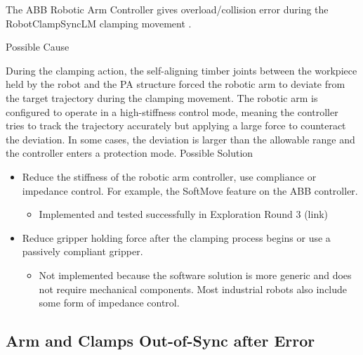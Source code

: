The ABB Robotic Arm Controller gives overload/collision error during the RobotClampSyncLM clamping movement .

Possible Cause

During the clamping action, the self-aligning timber joints between the workpiece held by the robot and the PA structure forced the robotic arm to deviate from the target trajectory during the clamping movement. The robotic arm is configured to operate in a high-stiffness control mode, meaning the controller tries to track the trajectory accurately but applying a large force to counteract the deviation. In some cases, the deviation is larger than the allowable range and the controller enters a protection mode.
Possible Solution
\begin{itemize}
    \item Reduce the stiffness of the robotic arm controller, use compliance or impedance control. For example, the SoftMove feature on the ABB controller.
    \begin{itemize}
        \item Implemented and tested successfully in Exploration Round 3 (link)
    \end{itemize}
    \item Reduce gripper holding force after the clamping process begins or use a passively compliant gripper.
    \begin{itemize}
        \item Not implemented because the software solution is more generic and does not require mechanical components. Most industrial robots also include some form of impedance control.
    \end{itemize}
\end{itemize}

\subsection{Arm and Clamps Out-of-Sync after Error}
\label{subsection:exploration-2-arm-and-clamps-out-of-sync-after-error}

